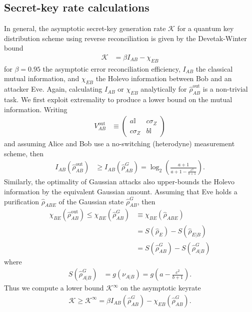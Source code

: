 \documentclass[%
 reprint,
 superscriptaddress,
 amsmath,
 amssymb,
 aps,
 pra,
]{revtex4-2}
\newcommand{\id}{\mathbb{I}}
\newcommand{\sz}{\sigma_Z}
\begin{document}
\begin{widetext}
\subsection{Secret-key rate calculations}
\label{app:ent:qkd}
In general, the asymptotic secret-key generation rate $\mathcal{K}$ for a quantum key distribution scheme using reverse reconciliation is given by the Devetak-Winter bound \cite{devetak_capacity_2005, laudenbach_continuousvariable_2018}
\begin{align}
    \mathcal{K} &= \beta I_{AB} - \chi_{EB}
\end{align}
for $\beta = 0.95$ the asymptotic error reconciliation efficiency, $I_{AB}$ the classical mutual information, and $\chi_{EB}$ the Holevo information between Bob and an attacker Eve. Again, calculating $I_{AB}$ or $\chi_{EB}$ analytically for $\hat \rho_{AB}^\mathrm{out}$ is a non-trivial task. We first exploit extremality \cite{wolf_extremality_2006} to produce a lower bound on the mutual information. Writing 
\begin{align}
    V_{AB}^\mathrm{out} &\equiv \begin{pmatrix}
        a\id & c\sz \\
        c\sz & b\id
    \end{pmatrix}
\end{align}
and assuming Alice and Bob use a no-switching (heterodyne) \cite{weedbrook_quantum_2004} measurement scheme, then
\begin{align}
    I_{AB}(\hat \rho_{AB}^\mathrm{out}) &\geq I_{AB}(\hat \rho_{AB}^G) = \log_2 \left( \frac{a + 1}{a + 1 -\frac{c^2}{b+1}} \right).
\end{align}
Similarly, the optimality of Gaussian attacks \cite{navascues_optimality_2006, garcia-patron_unconditional_2006} also upper-bounds the Holevo information by the equivalent Gaussian amount. Assuming that Eve holds a purification $\hat \rho_{ABE}$ of the Gaussian state $\hat \rho_{AB}^G$, then
\begin{align}
    \chi_{BE}(\hat \rho_{AB}^\mathrm{out}) \leq \chi_{BE}(\hat \rho_{AB}^G) &\equiv \chi_{BE}(\hat \rho_{ABE}) \\
    &= S(\hat \rho_E) - S(\hat \rho_{E|B}) \\
    &= S(\hat \rho_{AB}^G) - S(\hat \rho_{A|B}^G)
\end{align}
where
\begin{align}
    S(\hat \rho_{A|B}^G) &= g(\nu_{A|B}) = g\left( a - \frac{c^2}{b+1} \right).
\end{align}
Thus we compute a lower bound $\mathcal{K}^\infty$ on the asymptotic keyrate
\begin{align}
    \mathcal{K} \geq \mathcal{K}^\infty = \beta I_{AB}(\hat \rho_{AB}^G) - \chi_{EB}(\hat \rho_{AB}^G).
\end{align}

\end{widetext}
\end{document}
